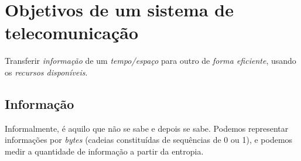 \documentclass[12pt]{book}
\let\cleardoublepage\clearpage
\begin{document}







\renewcommand{\cftchapdotsep}{\cftdotsep}
{\let\cleardoublepage\clearpage
\tableofcontents
}


\chapter{Objetivos de um sistema de telecomunicação}

Transferir \textit{informação} de um \textit{tempo/espaço} para outro de \textit{forma eficiente}, usando os \textit{recursos disponíveis}.

\section{Informação}
Informalmente, é aquilo que não se sabe e depois se sabe. Podemos representar informações por \textit{bytes} (cadeias constituídas de sequências de 0 ou 1), e podemos medir a quantidade de informação a partir da entropia.
\end{document}
